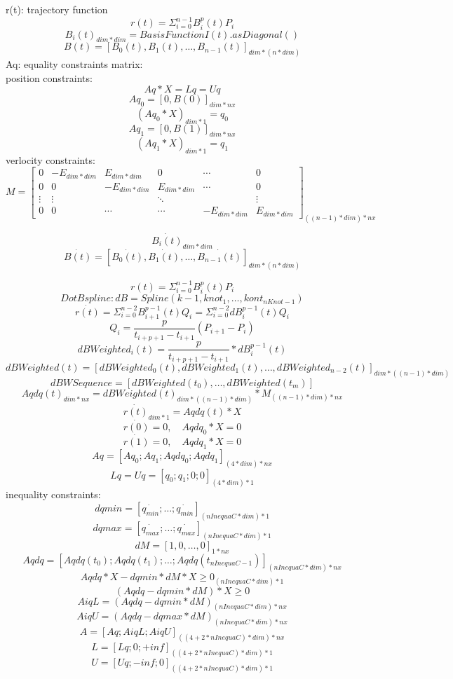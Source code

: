 \documentclass[]{article}
\begin{document}
    r(t): trajectory function \\
    \[ r(t) = \Sigma_{i = 0}^{n - 1}B_{i}^{p}(t)P_{i} \]
    \[B_{i}(t)_{dim * dim} =  BasisFunctionI(t).asDiagonal()\]
    \[B(t) = [B_{0}(t), B_{1}(t), \ldots, B_{n - 1}(t)]_{dim * (n * dim)} \]
    Aq: equality constraints matrix: \\
    position constraints:\\
    \[Aq * X = Lq = Uq \]
    \[ Aq_{0} = [0, B(0)]_{dim * nx} \]
    \[ (Aq_{0} * X)_{dim * 1} = q_{0} \]
    \[ Aq_{1} = [0, B(1)]_{dim * nx} \]
    \[ (Aq_{1} * X)_{dim * 1} = q_{1} \]
    verlocity constraints:\\
    \[ M = \begin{bmatrix}
        0 & -E_{dim * dim} & E_{dim * dim} & 0 & \cdots & 0 \\
        0 & 0 & -E_{dim * dim} & E_{dim * dim} & \cdots & 0 \\
        \vdots &  \vdots & & \ddots & & \vdots \\
        0 & 0 & \cdots &\cdots &-E_{dim * dim} & E_{dim * dim}
    \end{bmatrix}_{((n - 1) * dim) * nx} \]

    \[ \dot{B_i(t)}_{dim * dim}\]
    \[ \dot{B(t)} =  [\dot{B_{0}(t)}, \dot{B_{1}(t)}, \ldots, \dot{B_{n - 1}(t)}]_{dim * (n * dim)} \]
    
    \[ r(t) = \Sigma_{i = 0}^{n - 1}B_{i}^{p}(t)P_{i} \]
    \[ DotBspline: dB = Spline(k - 1, {knot_1,\dots, kont_{nKnot - 1}}) \]
    \[ \dot{r(t)} = \Sigma_{i = 0}^{n - 2}B_{i + 1}^{p - 1}(t)Q_{i} = \Sigma_{i = 0}^{n - 2}dB_{i}^{p - 1}(t)Q_{i} \]
    \[ Q_{i} = \frac{p}{t_{i + p + 1} - t_{i + 1}}(P_{i + 1} - P_{i}) \]
    \[ dBWeighted_{i}(t) = \frac{p}{t_{i + p + 1} - t_{i + 1}} * dB_{i}^{p - 1}(t) \]
    \[ dBWeighted(t) =  [dBWeighted_{0}(t), dBWeighted_{1}(t), \ldots, dBWeighted_{n - 2}(t)]_{dim * ((n - 1) * dim)} \]
    \[ dBWSequence = [dBWeighted(t_0), \dots, dBWeighted(t_m)] \]
    \[ Aqdq(t)_{dim * nx} = dBWeighted(t)_{dim * ((n - 1) * dim)} * M_{((n - 1) * dim) * nx} \]
    \[ \dot{r(t)}_{dim * 1} = Aqdq(t) * X \]
    \[ \dot{r(0)} = 0,\quad Aqdq_{0} * X = 0 \]
    \[ \dot{r(1)} = 0,\quad Aqdq_{1} * X = 0 \]
    \[ Aq = [Aq_{0}; Aq_{1}; Aqdq_{0}; Aqdq_{1}]_{(4 * dim) * nx} \]
    \[ Lq = Uq = [q_{0}; q_{1}; 0; 0]_{(4 * dim) * 1} \]
    inequality constraints: \\
    \[ dqmin = [\dot{q_{min}}; \ldots; \dot{q_{min}}]_{(nInequaC * dim) * 1} \]
    \[ dqmax = [\dot{q_{max}}; \ldots; \dot{q_{max}}]_{(nInequaC * dim) * 1} \]
    \[ dM = [1, 0, \ldots, 0]_{1 * nx} \]
    \[ Aqdq = [Aqdq(t_{0}); Aqdq(t_{1}); \ldots; Aqdq(t_{nInequaC - 1})]_{(nInequaC * dim) * nx} \]
    \[ Aqdq * X - dqmin * dM * X \geq 0_{(nInequaC * dim)*1} \]
    \[ (Aqdq - dqmin * dM) * X \geq 0 \]
    \[ AiqL = (Aqdq - dqmin * dM)_{(nInequaC * dim) * nx} \]
    \[ AiqU = (Aqdq - dqmax * dM)_{(nInequaC * dim) * nx} \]
    \[ A = [Aq; AiqL; AiqU]_{((4 + 2 * nInequaC) * dim) * nx}\]
    \[ L = [Lq; 0; +inf]_{((4 + 2 * nInequaC) * dim) * 1}\]
    \[ U = [Uq; -inf; 0]_{((4 + 2 * nInequaC) * dim) * 1}\]
\end{document}
